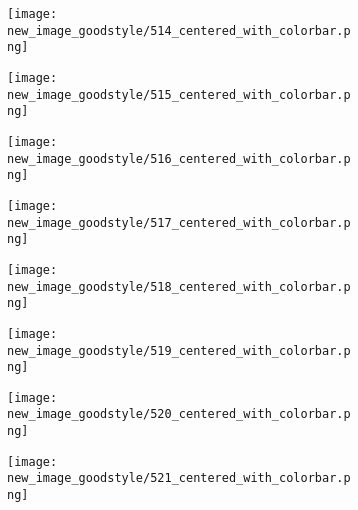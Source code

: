 \documentclass[a4paper,12pt]{article}
\begin{document}
\begin{figure}[H]
  \begin{subfigure}{0.11\textwidth}
    \texttt{[image: new\_image\_goodstyle/514\_centered\_with\_colorbar.png]}
  \end{subfigure}
  \hfill
  \begin{subfigure}{0.11\textwidth}
    \texttt{[image: new\_image\_goodstyle/515\_centered\_with\_colorbar.png]}
  \end{subfigure}
  \hfill
  \begin{subfigure}{0.11\textwidth}
    \texttt{[image: new\_image\_goodstyle/516\_centered\_with\_colorbar.png]}
  \end{subfigure}
  \hfill
  \begin{subfigure}{0.11\textwidth}
    \texttt{[image: new\_image\_goodstyle/517\_centered\_with\_colorbar.png]}
  \end{subfigure}
  \hfill
  \begin{subfigure}{0.11\textwidth}
    \texttt{[image: new\_image\_goodstyle/518\_centered\_with\_colorbar.png]}
  \end{subfigure}
  \hfill
  \begin{subfigure}{0.11\textwidth}
    \texttt{[image: new\_image\_goodstyle/519\_centered\_with\_colorbar.png]}
  \end{subfigure}
  \hfill
  \begin{subfigure}{0.11\textwidth}
    \texttt{[image: new\_image\_goodstyle/520\_centered\_with\_colorbar.png]}
  \end{subfigure}
  \hfill
  \begin{subfigure}{0.11\textwidth}
    \texttt{[image: new\_image\_goodstyle/521\_centered\_with\_colorbar.png]}
  \end{subfigure}
  \hfill
\end{figure}
\end{document}
